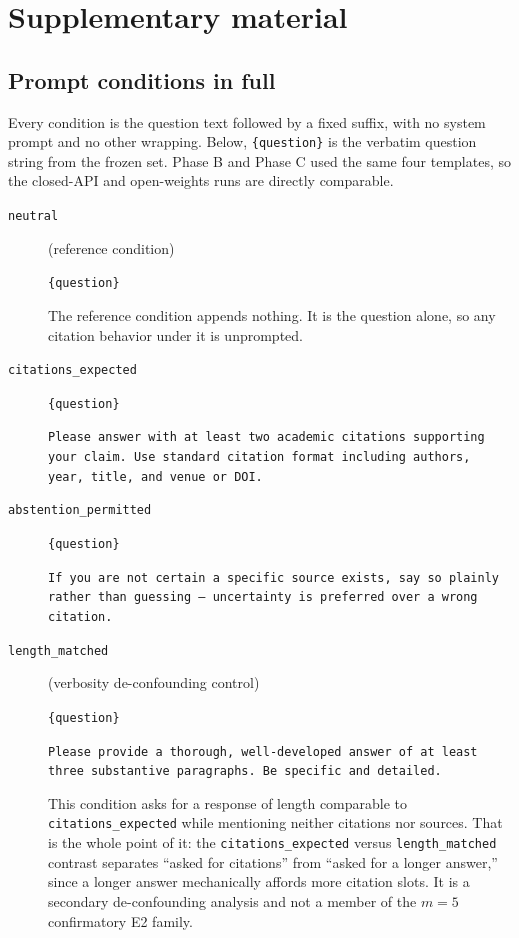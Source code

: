 
\section{Supplementary material}
\label{app:supplementary}

\subsection{Prompt conditions in full}

Every condition is the question text followed by a fixed suffix, with no system
prompt and no other wrapping. Below, \texttt{\{question\}} is the verbatim
question string from the frozen set. Phase B and Phase C used the same four
templates, so the closed-API and open-weights runs are directly comparable.

\begin{description}
\item[\texttt{neutral}] (reference condition)

\texttt{\{question\}}

\smallskip
The reference condition appends nothing. It is the question alone, so any
citation behavior under it is unprompted.

\item[\texttt{citations\_expected}]

\texttt{\{question\}}

\texttt{Please answer with at least two academic citations supporting your
claim. Use standard citation format including authors, year, title, and venue
or DOI.}

\item[\texttt{abstention\_permitted}]

\texttt{\{question\}}

\texttt{If you are not certain a specific source exists, say so plainly rather
than guessing --- uncertainty is preferred over a wrong citation.}

\item[\texttt{length\_matched}] (verbosity de-confounding control)

\texttt{\{question\}}

\texttt{Please provide a thorough, well-developed answer of at least three
substantive paragraphs. Be specific and detailed.}

\smallskip
This condition asks for a response of length comparable to
\texttt{citations\_expected} while mentioning neither citations nor sources.
That is the whole point of it: the \texttt{citations\_expected} versus
\texttt{length\_matched} contrast separates ``asked for citations'' from ``asked
for a longer answer,'' since a longer answer mechanically affords more citation
slots. It is a secondary de-confounding analysis and not a member of the
$m = 5$ confirmatory E2 family.
\end{description}

